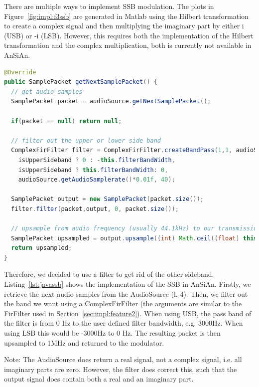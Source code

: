 There are multiple ways to implement SSB modulation. The plots in Figure~\ref{fig:impl:f3ssb} are generated in Matlab using the Hilbert transformation to create a complex signal and then multiplying the imaginary part by either i (USB) or -i (LSB). However, this requires both the implementation of the Hilbert transformation and the complex multiplication, both is currently not available in AnSiAn. 

\begin{lstlisting}[label=lst:javassb, caption=Modulating microphone samples using SSB, language=java,]
@Override
public SamplePacket getNextSamplePacket() {
  // get audio samples
  SamplePacket packet = audioSource.getNextSamplePacket();
	
  if(packet == null) return null;
	
  // filter out the upper or lower side band
  ComplexFirFilter filter = ComplexFirFilter.createBandPass(1,1, audioSource.getAudioSamplerate(),
	isUpperSideband ? 0 : -this.filterBandWidth,
	isUpperSideband ? this.filterBandWidth: 0,
	audioSource.getAudioSamplerate()*0.01f, 40);
	
  SamplePacket output = new SamplePacket(packet.size());
  filter.filter(packet,output, 0, packet.size());
	
  // upsample from audio frequency (usually 44.1kHz) to our transmission frequency (1MHz)
  SamplePacket upsampled = output.upsample((int) Math.ceil((float) this.sampleRate / audioSource.getAudioSamplerate()));
  return upsampled;
}
\end{lstlisting}


Therefore, we decided to use a filter to get rid of the other sideband. Listing~\ref{lst:javassb} shows the implementation of the SSB in AnSiAn. Firstly, we retrieve the next audio samples from the AudioSource (l. 4). Then, we filter out the band we want using a ComplexFirFilter (the arguments are similar to the FirFilter used in Section~\ref{sec:impl:feature2}). When using USB, the pass band of the filter is from 0 Hz to the user defined filter bandwidth, e.g. 3000Hz. When using LSB this would be -3000Hz to 0 Hz. The resulting packet is then upsampled to 1MHz and returned to the modulator. 

Note: The AudioSource does return a real signal, not a complex signal, i.e. all imaginary parts are zero. However, the filter does correct this, such that the output signal does contain both a real and an imaginary part.

